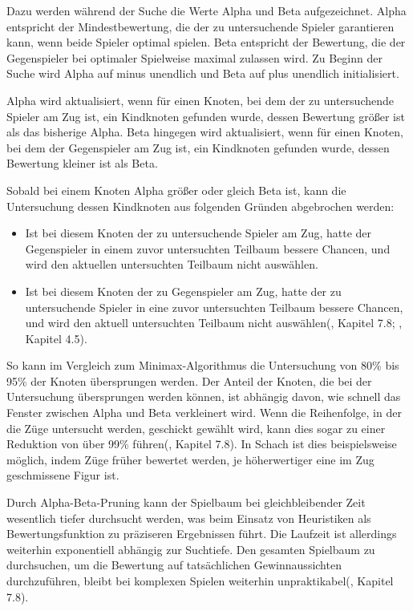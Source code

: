Dazu werden während der Suche die Werte Alpha und Beta aufgezeichnet. Alpha entspricht der Mindestbewertung, die der zu untersuchende Spieler garantieren kann, wenn beide Spieler optimal spielen. Beta entspricht der Bewertung, die der Gegenspieler bei optimaler Spielweise maximal zulassen wird. Zu Beginn der Suche wird Alpha auf minus unendlich und Beta auf plus unendlich initialisiert.

Alpha wird aktualisiert, wenn für einen Knoten, bei dem der zu untersuchende Spieler am Zug ist, ein Kindknoten gefunden wurde, dessen Bewertung größer ist als das bisherige Alpha. Beta hingegen wird aktualisiert, wenn für einen Knoten, bei dem der Gegenspieler am Zug ist, ein Kindknoten gefunden wurde, dessen Bewertung kleiner ist als Beta.

Sobald bei einem Knoten Alpha größer oder gleich Beta ist, kann die Untersuchung dessen Kindknoten aus folgenden Gründen abgebrochen werden:

\begin{itemize}
	\item Ist bei diesem Knoten der zu untersuchende Spieler am Zug, hatte der Gegenspieler in einem zuvor untersuchten Teilbaum bessere Chancen, und wird den aktuellen untersuchten Teilbaum nicht auswählen.
	\item Ist bei diesem Knoten der zu Gegenspieler am Zug, hatte der zu untersuchende Spieler in eine zuvor untersuchten Teilbaum bessere Chancen, und wird den aktuell untersuchten Teilbaum nicht auswählen(\cite{Heineman.October2008}, Kapitel 7.8; \cite{Ferguson.January2019}, Kapitel 4.5).
\end{itemize}

So kann im Vergleich zum Minimax-Algorithmus die Untersuchung von 80\% bis 95\% der Knoten übersprungen werden. Der Anteil der Knoten, die bei der Untersuchung übersprungen werden können, ist abhängig davon, wie schnell das Fenster zwischen Alpha und Beta verkleinert wird. Wenn die Reihenfolge, in der die Züge untersucht werden, geschickt gewählt wird, kann dies sogar zu einer Reduktion von über 99\% führen(\cite{Heineman.October2008}, Kapitel 7.8). In Schach ist dies beispielsweise möglich, indem Züge früher bewertet werden, je höherwertiger eine im Zug geschmissene Figur ist.

Durch Alpha-Beta-Pruning kann der Spielbaum bei gleichbleibender Zeit wesentlich tiefer durchsucht werden, was beim Einsatz von Heuristiken als Bewertungsfunktion zu präziseren Ergebnissen führt. Die Laufzeit ist allerdings weiterhin exponentiell abhängig zur Suchtiefe. Den gesamten Spielbaum zu durchsuchen, um die Bewertung auf tatsächlichen Gewinnaussichten durchzuführen, bleibt bei komplexen Spielen weiterhin unpraktikabel(\cite{Heineman.October2008}, Kapitel 7.8).


